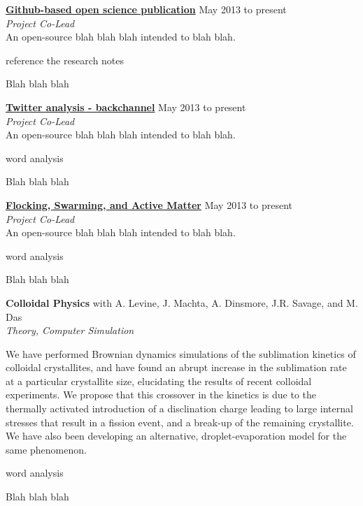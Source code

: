 \documentclass[10pt]{article}
\newcommand{\blankline}{\quad\pagebreak[3]}
\newcommand{\halfblankline}{\quad\vspace{-0.5\baselineskip}\pagebreak[3]}
\begin{document}
\href{http://openwaterproject.io}{\textbf{Github-based open science publication}} \hfill {May 2013 to present} \\
\emph{Project Co-Lead} \\
An open-source blah blah blah intended to blah blah.
    \begin{innerlist}
        \item reference the research notes
        \item Blah blah blah 

\end{innerlist}

\halfblankline

\href{http://openwaterproject.io}{\textbf{Twitter analysis - backchannel}} \hfill {May 2013 to present} \\
\emph{Project Co-Lead} \\
An open-source blah blah blah intended to blah blah.
    \begin{innerlist}
        \item word analysis
        \item Blah blah blah 

\end{innerlist}

\halfblankline

\href{http://openwaterproject.io}{\textbf{Flocking, Swarming, and Active Matter}} \hfill {May 2013 to present} \\
\emph{Project Co-Lead} \\
An open-source blah blah blah intended to blah blah.
    \begin{innerlist}
        \item word analysis
        \item Blah blah blah 

\end{innerlist}

\blankline

\textbf{Colloidal Physics} \hfill {with A. Levine, J. Machta, A. Dinsmore, J.R. Savage, and M. Das} \\
\emph{Theory, Computer Simulation} 

\halfblankline

We have performed Brownian dynamics simulations of the sublimation kinetics of colloidal crystallites, and
have found an abrupt increase in the sublimation rate at a particular crystallite size, elucidating the results of
recent colloidal experiments. We propose that this crossover in the kinetics is due to the thermally activated
introduction of a disclination charge leading to large internal stresses that result in a fission event, and a
break-up of the remaining crystallite. We have also been developing an alternative, droplet-evaporation
model for the same phenomenon.
    \begin{innerlist}
        \item word analysis
        \item Blah blah blah 

\end{innerlist}
\end{document}
